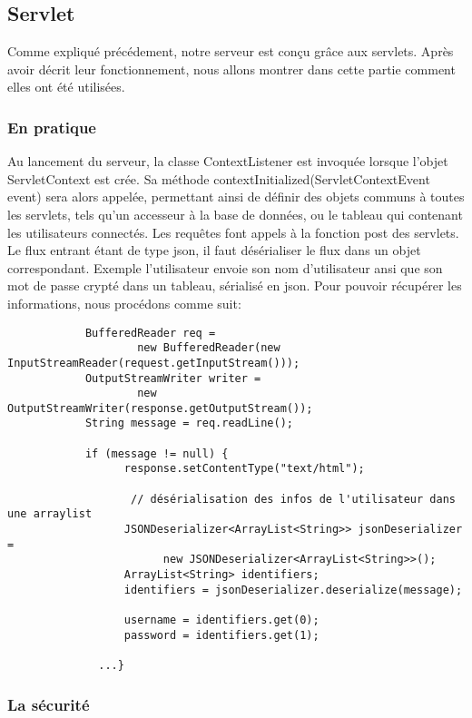 \subsection{Servlet}
	
	Comme expliqué précédement, notre serveur est conçu grâce aux \glspl{servlet}.
	Après avoir décrit leur fonctionnement, nous allons montrer dans cette partie
	comment elles ont été utilisées.
		
	\subsubsection{En pratique}
		Au lancement du serveur, la classe ContextListener est invoquée lorsque l'objet
		ServletContext est crée. Sa méthode contextInitialized(ServletContextEvent event) sera alors appelée, 
		permettant ainsi de définir des objets communs à toutes les
		\glspl{servlet}, tels qu'un accesseur à la base de données, ou le tableau qui
		contenant les utilisateurs connectés. Les requêtes font appels à la fonction
		post des \glspl{servlet}. Le flux entrant étant de type \gls{json}, il faut
		désérialiser le flux dans un objet correspondant. Exemple l'utilisateur envoie son nom d'utilisateur ansi que son mot de passe crypté
		dans un tableau, sérialisé en \gls{json}.
		Pour pouvoir récupérer les informations, nous procédons comme suit: 
		
		\begin{verbatim}
			BufferedReader req = 
				    new BufferedReader(new InputStreamReader(request.getInputStream()));
			OutputStreamWriter writer = 
				    new OutputStreamWriter(response.getOutputStream());
			String message = req.readLine();
			
			if (message != null) {
				  response.setContentType("text/html");
				
				   // désérialisation des infos de l'utilisateur dans une arraylist 
				  JSONDeserializer<ArrayList<String>> jsonDeserializer = 
					    new JSONDeserializer<ArrayList<String>>();
				  ArrayList<String> identifiers;
				  identifiers = jsonDeserializer.deserialize(message);
				
				  username = identifiers.get(0);
				  password = identifiers.get(1);
				  
			  ...}
		\end{verbatim}
		
		
	\subsubsection{La sécurité}
	
